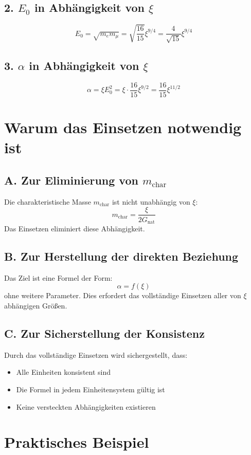 \documentclass[12pt, a4paper]{article}
\begin{document}
\subsection*{2. $E_0$ in Abhängigkeit von $\xi$}
\[
E_0 = \sqrt{m_e m_\mu} = \sqrt{\frac{16}{15}} \xi^{9/4} = \frac{4}{\sqrt{15}} \xi^{9/4}
\]

\subsection*{3. $\alpha$ in Abhängigkeit von $\xi$}
\[
\alpha = \xi E_0^2 = \xi \cdot \frac{16}{15} \xi^{9/2} = \frac{16}{15} \xi^{11/2}
\]

\section*{Warum das Einsetzen notwendig ist}

\subsection*{A. Zur Eliminierung von $m_{\text{char}}$}
Die charakteristische Masse $m_{\text{char}}$ ist nicht unabhängig von $\xi$:
\[
m_{\text{char}} = \frac{\xi}{2G_{\text{nat}}}
\]
Das Einsetzen eliminiert diese Abhängigkeit.

\subsection*{B. Zur Herstellung der direkten Beziehung}
Das Ziel ist eine Formel der Form:
\[
\alpha = f(\xi)
\]
ohne weitere Parameter. Dies erfordert das vollständige Einsetzen aller von $\xi$ abhängigen Größen.

\subsection*{C. Zur Sicherstellung der Konsistenz}
Durch das vollständige Einsetzen wird sichergestellt, dass:
\begin{itemize}
	\item Alle Einheiten konsistent sind
	\item Die Formel in jedem Einheitensystem gültig ist
	\item Keine versteckten Abhängigkeiten existieren
\end{itemize}

\section*{Praktisches Beispiel}
\end{document}

